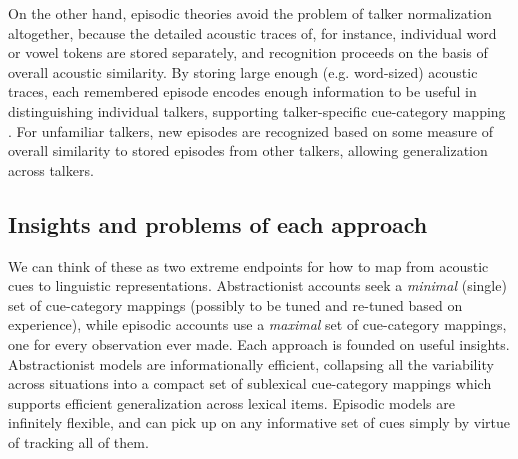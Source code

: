 On the other hand, episodic theories avoid the problem of talker normalization altogether, because the detailed acoustic traces of, for instance, individual word or vowel tokens are stored separately, and recognition proceeds on the basis of overall acoustic similarity.  By storing large enough (e.g. word-sized) acoustic traces, each remembered episode encodes enough information to be useful in distinguishing individual talkers, supporting talker-specific cue-category mapping \autocite{Goldinger1998,Johnson1997a,Pierrehumbert2002}.  For unfamiliar talkers, new episodes are recognized based on some measure of overall similarity to stored episodes from other talkers, allowing generalization across talkers.  

\subsection{Insights and problems of each approach}
\label{sec:problems-with-each-approach}
\label{r3-granularity-of-mapping}

We can think of these as two extreme endpoints for how to map from acoustic cues to linguistic representations.  Abstractionist accounts seek a \emph{minimal} (single) set of cue-category mappings (possibly to be tuned and re-tuned based on experience), while episodic accounts use a \emph{maximal} set of cue-category mappings, one for every observation ever made.
Each approach is founded on useful insights. Abstractionist models are informationally efficient, collapsing all the variability across situations into a compact set of sublexical cue-category mappings which supports efficient generalization across lexical items.  Episodic models are infinitely flexible, and can pick up on any informative set of cues simply by virtue of tracking all of them. 

